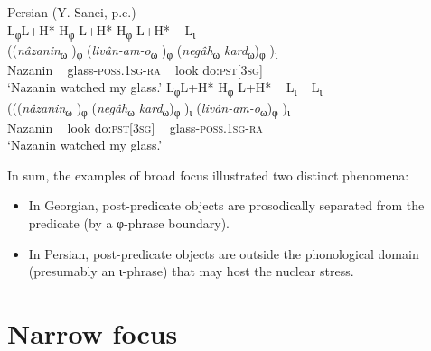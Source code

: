 \documentclass[output=paper,colorlinks,citecolor=brown]{langscibook}
\begin{document}
\begin{samepage}
\ea \label{ex:persianBroad}
    Persian (Y. Sanei, p.c.) \\ \nopagebreak[4]
    \ea 
    \glll \textup{L\textsubscript{φ}}\hspace{0.4cm}\textup{L+H*} \textup{H\textsubscript{φ}} \hspace{0.3cm}\textup{L+H*} \textup{H\textsubscript{φ}} \hspace{0.4cm}\textup{L+H*} ~ \textup{L\textsubscript{ι}} \\
    ((\textit{nâza\textquotesingle nin}\textsubscript{ω} )\textsubscript{φ} (\textit{li\textquotesingle vân-am-o}\textsubscript{ω} )\textsubscript{φ} (\textit{ne\textquotesingle gâh}\textsubscript{ω} \textit{kard}\textsubscript{ω})\textsubscript{φ} )\textsubscript{ι}\\
            Nazanin ~ glass-\textsc{poss.1sg-ra} ~ look do:\textsc{pst}[\textsc{3sg}]\\
            \glt ‘Nazanin watched my glass.’
    \ex 
        \glll \textup{L\textsubscript{φ}}\hspace{0.5cm}\textup{L+H*} \textup{H\textsubscript{φ}} \hspace{0.4cm}\textup{L+H*} ~ \textup{L\textsubscript{ι}} ~ \textup{L\textsubscript{ι}} \\
            (((\textit{nâza\textquotesingle nin}\textsubscript{ω} )\textsubscript{φ} (\textit{ne\textquotesingle gâh}\textsubscript{ω} \textit{kard}\textsubscript{ω})\textsubscript{φ} )\textsubscript{ι} (\textit{li\textquotesingle vân-am-o}\textsubscript{ω})\textsubscript{φ} )\textsubscript{ι}\\
            Nazanin ~ look do:\textsc{pst}[\textsc{3sg}] ~ glass-\textsc{poss.1sg-ra}\\
        \glt ‘Nazanin watched my glass.’
    \z
\z
\end{samepage}

In sum, the examples of broad focus illustrated two distinct phenomena:
\begin{itemize}
  \item In Georgian, post-predicate objects are prosodically separated from the predicate (by a φ-phrase boundary). 
  \item In Persian, post-predicate objects are outside the phonological domain (presumably an ι-phrase) that may host the nuclear stress.
\end{itemize}

\section{Narrow focus} \label{sec:narrow}
\end{document}
